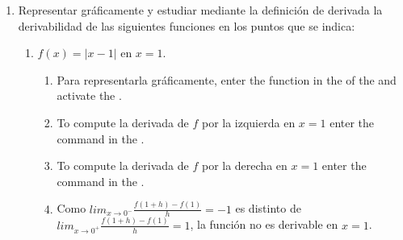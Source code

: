 \begin{enumerate}[leftmargin=*]
% 


\item Representar gráficamente y estudiar mediante la definición de derivada la derivabilidad de las siguientes funciones en los puntos que se indica:
      \begin{enumerate}
      \item $f(x)=|x-1|$ en $x=1$.

            \begin{indication}
            \begin{enumerate}
            \item Para representarla gráficamente, enter the function  in the  of the  and activate the .
            \item To compute la derivada de $f$ por la izquierda en $x=1$ enter the command  in the .
            \item To compute la derivada de $f$ por la derecha en $x=1$ enter the command  in the .
            \item Como $lim_{x\rightarrow 0^-}\frac{f(1+h)-f(1)}{h}=-1$ es distinto de $lim_{x\rightarrow 0^+}\frac{f(1+h)-f(1)}{h}=1$, la función no es derivable en $x=1$.
            \end{enumerate}
            \end{indication}


\end{enumerate}
\end{enumerate}
